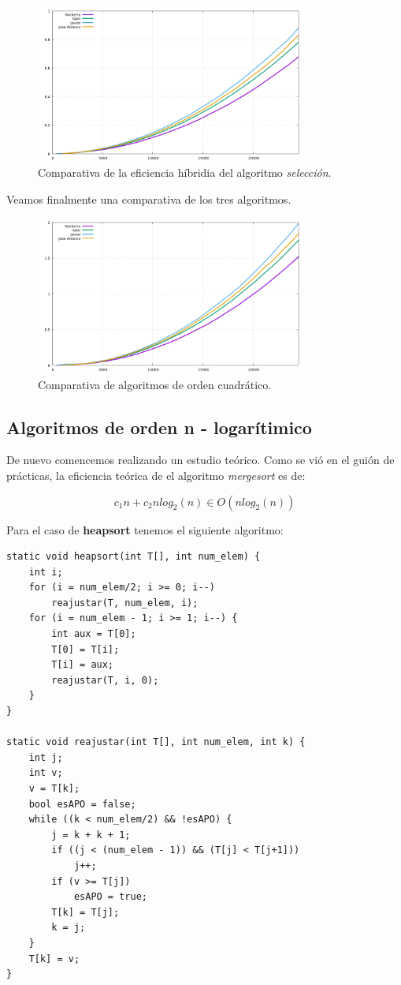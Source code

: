 \documentclass[11pt,a4paper]{article}
\begin{document}
\begin{figure}[H]
	\centering
	\includegraphics[width=0.8\textwidth]{../plots/seleccion}
	\caption{Comparativa de la eficiencia híbridia del algoritmo \emph{selección}.}
\end{figure}

Veamos finalmente una comparativa de los tres algoritmos.

\begin{figure}[H]
	\centering
	\includegraphics[width=0.8\textwidth]{../plots/burbuja}
	\caption{Comparativa de algoritmos de orden cuadrático.}
\end{figure}

\subsection{Algoritmos de orden n - logarítimico}

De nuevo comencemos realizando un estudio teórico. Como se vió en el guión de prácticas, la eficiencia teórica de el algoritmo \emph{mergesort} es de:

$$c_1n + c_2nlog_2(n) \in O(nlog_2(n))$$

Para el caso de \textbf{heapsort} tenemos el siguiente algoritmo:

\begin{lstlisting}
static void heapsort(int T[], int num_elem) {
	int i;
	for (i = num_elem/2; i >= 0; i--)
		reajustar(T, num_elem, i);
	for (i = num_elem - 1; i >= 1; i--) {
		int aux = T[0];
		T[0] = T[i];
		T[i] = aux;
		reajustar(T, i, 0);
	}
}

static void reajustar(int T[], int num_elem, int k) {
	int j;
	int v;
	v = T[k];
	bool esAPO = false;
	while ((k < num_elem/2) && !esAPO) {
		j = k + k + 1;
		if ((j < (num_elem - 1)) && (T[j] < T[j+1]))
			j++;
		if (v >= T[j])
			esAPO = true;
		T[k] = T[j];
		k = j;
	}
	T[k] = v;
}
\end{lstlisting}
\end{document}
